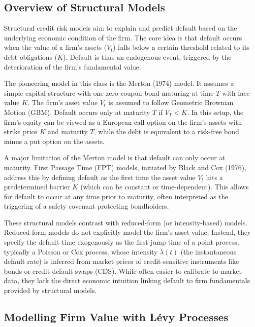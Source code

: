 \documentclass[11pt,twoside,openright]{report}
\begin{document}
\subsection{Overview of Structural Models}
\label{subsec:overview_structural}

Structural credit risk models aim to explain and predict default based on the underlying economic condition of the firm. The core idea is that default occurs when the value of a firm's assets ($V_t$) falls below a certain threshold related to its debt obligations ($K$). Default is thus an endogenous event, triggered by the deterioration of the firm's fundamental value.

The pioneering model in this class is the Merton (1974) model. It assumes a simple capital structure with one zero-coupon bond maturing at time $T$ with face value $K$. The firm's asset value $V_t$ is assumed to follow Geometric Brownian Motion (GBM). Default occurs only at maturity $T$ if $V_T < K$. In this setup, the firm's equity can be viewed as a European call option on the firm's assets with strike price $K$ and maturity $T$, while the debt is equivalent to a risk-free bond minus a put option on the assets.

A major limitation of the Merton model is that default can only occur at maturity. First Passage Time (FPT) models, initiated by Black and Cox (1976), address this by defining default as the first time the asset value $V_t$ hits a predetermined barrier $K$ (which can be constant or time-dependent). This allows for default to occur at any time prior to maturity, often interpreted as the triggering of a safety covenant protecting bondholders.

These structural models contrast with reduced-form (or intensity-based) models. Reduced-form models do not explicitly model the firm's asset value. Instead, they specify the default time exogenously as the first jump time of a point process, typically a Poisson or Cox process, whose intensity $\lambda(t)$ (the instantaneous default rate) is inferred from market prices of credit-sensitive instruments like bonds or credit default swaps (CDS). While often easier to calibrate to market data, they lack the direct economic intuition linking default to firm fundamentals provided by structural models.

\subsection{Modelling Firm Value with Lévy Processes}
\label{subsec:modelling_firm_value}
\end{document}
